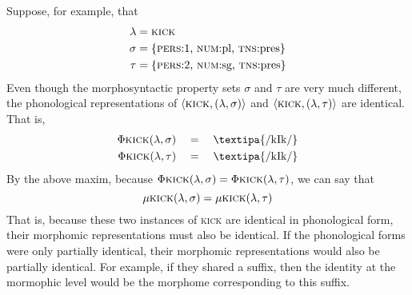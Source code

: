 Suppose, for example, that 
\begin{align*}
\lambda &= \textsc{kick} \\%
\sigma &= \{\text{\textsc{pers}:1, \textsc{num}:pl, \textsc{tns}:pres} \} \\%
\tau &=\{\text{\textsc{pers}:2, \textsc{num}:sg, \textsc{tns}:pres}\}
\end{align*}
Even though the morphosyntactic property sets $\sigma$ and $\tau$ are very much different,
the phonological representations of $\langle \textsc{kick}, (\lambda,\sigma) \rangle$
and $\langle \textsc{kick}, (\lambda,\tau) \rangle$ are identical. 
That is,
\begin{align*}
\Phi\textsc{kick}(\lambda,\sigma) \quad &= \quad \text{\textipa{/kIk/}} \\%
\Phi{\textsc{kick}}(\lambda,\tau) \quad &= \quad \text{\textipa{/kIk/}} %
\end{align*} 
By the above maxim, because
$\Phi{\textsc{kick}}(\lambda,\sigma) =  \Phi{\textsc{kick}}(\lambda,\tau)$, we can say that  %
\begin{equation*}
\mu{\textsc{kick}}(\lambda,\sigma) = \mu{\textsc{kick}}(\lambda,\tau) %
\end{equation*}
That is, because these two instances of \textsc{kick} are identical in 
phonological form, their morphomic representations must also be identical. 
If the 
phonological forms were only partially identical, their morphomic 
representations would also be partially identical. For example, if they 
shared a suffix, then the identity at the mormophic level would 
be the morphome corresponding to this suffix.

